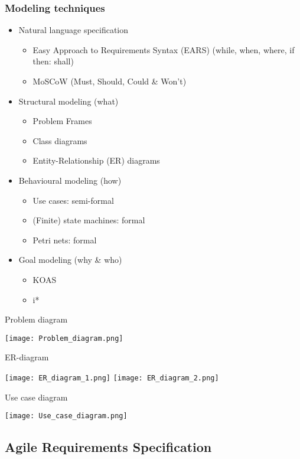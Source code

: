 \subsubsection{Modeling techniques}
\begin{itemize}
	\item Natural language specification
		\begin{itemize}
			\item Easy Approach to Requirements Syntax (EARS) \newline
					(while, when, where, if then: shall)
			\item MoSCoW (Must, Should, Could \& Won't)
		\end{itemize}
	\item Structural modeling (what)
		\begin{itemize}
			\item Problem Frames
			\item Class diagrams
			\item Entity-Relationship (ER) diagrams 
		\end{itemize}
	\item Behavioural modeling (how)
		\begin{itemize}
			\item Use cases: semi-formal
			\item (Finite) state machines: formal
			\item Petri nets: formal
		\end{itemize}
	\item Goal modeling (why \& who)
		\begin{itemize}
			\item KOAS
			\item i*
		\end{itemize}
\end{itemize}
\begin{table}[H]
\caption{Problem diagram}
\texttt{[image: Problem\_diagram.png]}
\end{table}
\begin{table}[H]
\caption{ER-diagram}
\texttt{[image: ER\_diagram\_1.png]}
\texttt{[image: ER\_diagram\_2.png]}
\end{table}
\begin{table}[H]
\caption{Use case diagram}
\texttt{[image: Use\_case\_diagram.png]}
\end{table}
\subsection{Agile Requirements Specification}
